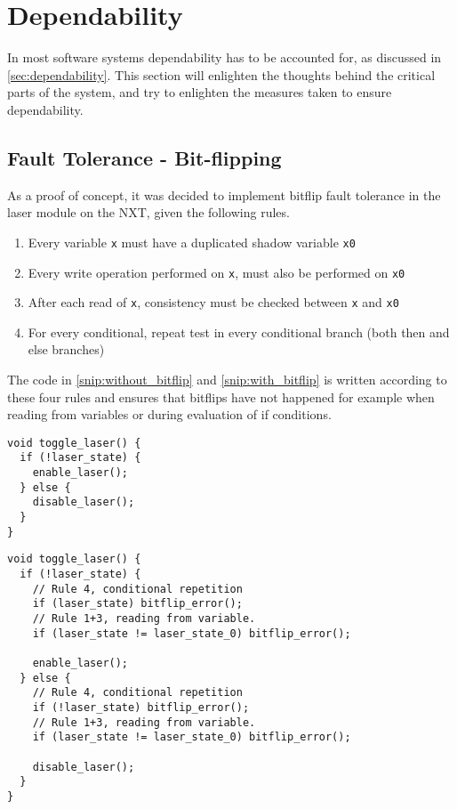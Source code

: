 \section{Dependability}\label{Design:Dependability}
In most software systems dependability has to be accounted for, as discussed in \autoref{sec:dependability}.
This section will enlighten the thoughts behind the critical parts of the system, and try to enlighten the measures taken to ensure dependability.

\subsection{Fault Tolerance - Bit-flipping}
As a proof of concept, it was decided to implement bitflip fault tolerance in the laser module on the NXT, given the following rules.

\begin{enumerate}
  \item Every variable \texttt{x} must have a duplicated shadow variable \texttt{x0} \cite{errorDetectionSoft}
  \item Every write operation performed on \texttt{x}, must also be performed on \texttt{x0} \cite{errorDetectionSoft}
  \item After each read of \texttt{x}, consistency must be checked between \texttt{x} and \texttt{x0} \cite{errorDetectionSoft}
  \item For every conditional, repeat test in every conditional branch (both then and else branches) \cite{errorDetectionSoft}
\end{enumerate}

The code in \autoref{snip:without_bitflip} and \autoref{snip:with_bitflip} is written according to these four rules and ensures that bitflips have not happened for example when reading from variables or during evaluation of if conditions.

\noindent\begin{minipage}{.45\textwidth}
\begin{lstlisting}[label={snip:without_bitflip},caption={Without~bitflip-security},frame=tlrb,numbers=none]
void toggle_laser() {
  if (!laser_state) {
    enable_laser();
  } else {
    disable_laser();
  }
}
\end{lstlisting}
\end{minipage}\hfill
\begin{minipage}{.45\textwidth}
\begin{lstlisting}[label={snip:with_bitflip},caption={With bitflip-security},frame=tlrb,numbers=none]
void toggle_laser() {
  if (!laser_state) {
    // Rule 4, conditional repetition
    if (laser_state) bitflip_error();
    // Rule 1+3, reading from variable.
    if (laser_state != laser_state_0) bitflip_error();

    enable_laser();
  } else {
    // Rule 4, conditional repetition
    if (!laser_state) bitflip_error();
    // Rule 1+3, reading from variable.
    if (laser_state != laser_state_0) bitflip_error();

    disable_laser();
  }
}
\end{lstlisting}
\end{minipage}

